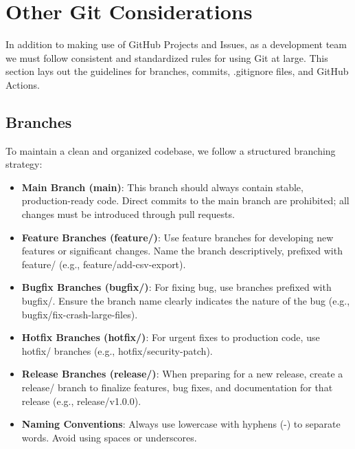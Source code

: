 \documentclass{ol-softwaremanual}
\begin{document}
\section{Other Git Considerations}
In addition to making use of GitHub Projects and Issues, as a development team we must follow consistent and standardized rules for using Git at large. This section lays out the guidelines for branches, commits, .gitignore files, and GitHub Actions.
\subsection{Branches}
To maintain a clean and organized codebase, we follow a structured branching strategy:
\begin{itemize}
    \item \textbf{Main Branch (main)}: This branch should always contain stable, production-ready code. Direct commits to the main branch are prohibited; all changes must be introduced through pull requests.
    \item \textbf{Feature Branches (feature/)}: Use feature branches for developing new features or significant changes. Name the branch descriptively, prefixed with feature/ (e.g., feature/add-csv-export).
    \item \textbf{Bugfix Branches (bugfix/)}: For fixing bug, use branches prefixed with bugfix/. Ensure the branch name clearly indicates the nature of the bug (e.g., bugfix/fix-crash-large-files).
    \item \textbf{Hotfix Branches (hotfix/)}: For urgent fixes to production code, use hotfix/ branches (e.g., hotfix/security-patch).
    \item \textbf{Release Branches (release/)}: When preparing for a new release, create a release/ branch to finalize features, bug fixes, and documentation for that release (e.g., release/v1.0.0).
    \item \textbf{Naming Conventions}: Always use lowercase with hyphens (-) to separate words. Avoid using spaces or underscores.
\end{itemize}
\end{document}
